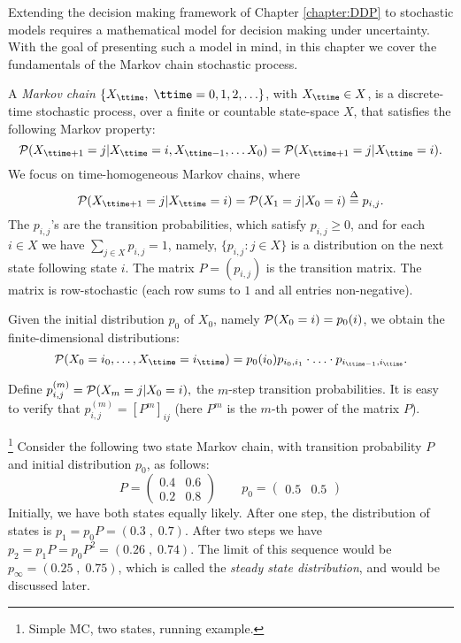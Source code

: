 


Extending the decision making framework of Chapter \ref{chapter:DDP} to stochastic models requires a mathematical model for decision making under uncertainty. With the goal of presenting such a model in mind, in this chapter we cover the fundamentals of the Markov chain stochastic process.


A \emph{Markov chain} $\{ {X_\ttime},\;\ttime = 0,1,2, \ldots \} $, with
${X_\ttime} \in X$, is a discrete-time stochastic process, over a
finite or countable state-space $X$, that satisfies the following
Markov property:
    \[{\cal P}({X_{\ttime +1}} = j|{X_\ttime} = i,{X_{\ttime - 1}}, \ldots {X_0}) = {\cal P}({X_{\ttime +1}} = j|{X_\ttime} = i).\]
We focus on time-homogeneous Markov chains, where
\[{\cal P}({X_{\ttime +1}} = j|{X_\ttime} = i) = {\cal P}({X_1} = j|{X_0} = i) \buildrel \Delta \over = {p_{i,j}}.\]
The ${p_{i,j}}$'s  are the transition probabilities, which satisfy
$p_{i,j} \ge 0$, and for each $ i\in X$ we have $\sum_{j \in X}
{{p_{i,j}} = 1} $, namely, $\{p_{i,j}:j\in X\}$ is a distribution on
the next state following state $i$.  The matrix $P = ({p_{i,j}})$ is
the transition matrix. The matrix is row-stochastic (each row sums
to $1$ and all entries non-negative).

Given the initial distribution ${p_0}$ of ${X_0}$, namely ${\cal
P}({X_0} = i) = {p_0}(i)$, we obtain the finite-dimensional
distributions:
\[{\cal P}({X_0} = {i_0}, \ldots ,{X_\ttime} = {i_\ttime}) = {p_0}(i_0){p_{{i_0},{i_1}}} \cdot  \ldots  \cdot {p_{{i_{\ttime - 1}},{i_\ttime}}}.\]

Define $p_{i,j}^{(m)} = {\cal P}({X_m} = j|{X_0} = i),$ the $m$-step
transition probabilities.  It is easy to verify that $p_{i,j}^{(m)}
= {[{P^m}]_{ij}}$  (here ${P^m}$ is the $m$-th power of the matrix
$P$).

\begin{example}
\footnote{Simple MC, two states, running example.} Consider the
following two state Markov chain, with transition probability $P$
and initial distribution $p_0$, as follows:
$$
P=
\begin{pmatrix}
0.4 & 0.6  \\
0.2 & 0.8
\end{pmatrix}
\qquad p_0=
\begin{pmatrix}
0.5  & 0.5
\end{pmatrix}
$$
Initially, we have both states equally likely. After one step, the
distribution of states is $p_1=p_0 P=(0.3\;,\; 0.7)$. After two
steps we have $p_2=p_1 P=p_0 P^2 = (0.26 \;,\; 0.74 )$. The limit of
this sequence would be $p_\infty =(0.25 \;,\; 0.75)$, which is
called the {\em steady state distribution}, and would be discussed
later.
\end{example}

